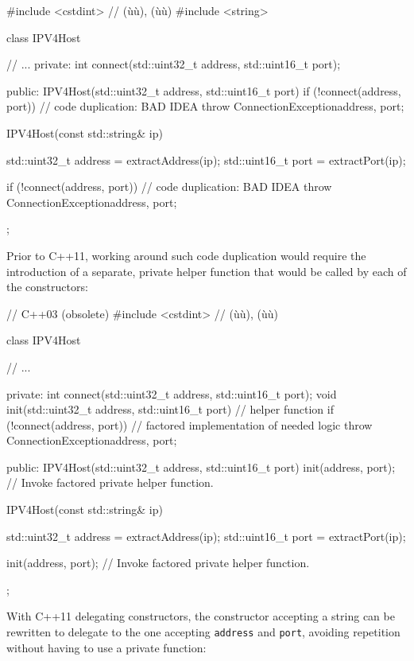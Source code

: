 \begin{emcppslisting}[language=C++]
#include <cstdint> // (ù{}ù), (ù{}ù)
#include <string>

class IPV4Host
{
     // ...
private:
    int connect(std::uint32_t address, std::uint16_t port);

public:
    IPV4Host(std::uint32_t address, std::uint16_t port)
    {
        if (!connect(address, port))  // code duplication: BAD IDEA
        {
            throw ConnectionException{address, port};
        }
    }

    IPV4Host(const std::string& ip)
    {
        std::uint32_t address = extractAddress(ip);
        std::uint16_t port = extractPort(ip);

        if (!connect(address, port))  // code duplication: BAD IDEA
        {
            throw ConnectionException{address, port};
        }
    }
};
\end{emcppslisting}

\noindent Prior to C++11, working around such code duplication would require the
introduction of a separate, private helper function that
would be called by each of the constructors:

\begin{emcppslisting}[language=C++]
// C++03 (obsolete)
#include <cstdint>  // (ù{}ù), (ù{}ù)

class IPV4Host
{
    // ...

private:
    int connect(std::uint32_t address, std::uint16_t port);
    void init(std::uint32_t address, std::uint16_t port)  // helper function
    {
        if (!connect(address, port))  // factored implementation of needed logic
        {
            throw ConnectionException{address, port};
        }
    }

public:
    IPV4Host(std::uint32_t address, std::uint16_t port)
    {
        init(address, port);  // Invoke factored private helper function.
    }

    IPV4Host(const std::string& ip)
    {
        std::uint32_t address = extractAddress(ip);
        std::uint16_t port = extractPort(ip);

        init(address, port);  // Invoke factored private helper function.
    }
};
\end{emcppslisting}

\noindent With C++11 delegating constructors, the constructor accepting a string can be rewritten to
delegate to the one accepting \lstinline!address! and \lstinline!port!,
avoiding repetition without having to use a private function:

